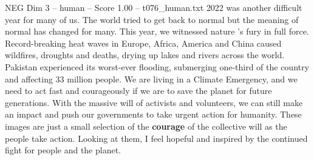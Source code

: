 \begin{textsample}{NEG Dim 3 – human – Score 1.00 – t076\_human.txt}  \label{ex:f3_neg_047}
2022 was another difficult year for many of us.
The world tried to get back to normal but the meaning of normal has changed for many.
This year, we witnessed nature ’s fury in full force.
Record-breaking heat waves in Europe, Africa, America and China caused wildfires, droughts and deaths, drying up lakes and rivers across the world.
Pakistan experienced its worst-ever flooding, submerging one-third of the country and affecting 33 million people.
We are living in a Climate Emergency, and we need to act fast and courageously if we are to save the planet for future generations.
With the massive will of activists and volunteers, we can still make an impact and push our governments to take urgent action for humanity.
These images are just a small selection of the \textbf{courage} of the collective will as the people take action.
Looking at them, I feel hopeful and inspired by the continued fight for people and the planet.

\end{textsample}
